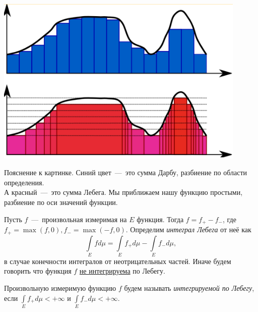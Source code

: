 \begin{minipage}{0.5\textwidth}%
    \includegraphics[width=0.9\textwidth]{images/Screenshot_7.png} 
\end{minipage}%
 \hfill%
 \begin{minipage}{0.5\textwidth}\raggedright
Пояснение к картинке. Синий цвет~---~это сумма Дарбу, разбиение по области определения.\\ А красный~---~это сумма Лебега. Мы приближаем нашу функцию простыми, разбиение по оси значений функции.
 \end{minipage}


\begin{definition}
    Пусть $f$~---~произвольная измеримая на $E$ функция. Тогда $f = f_+ - f_-$, где $f_+ = \max(f, 0), f_- = \max(-f, 0)$. Определим \textit{интеграл Лебега} от неё как \[\int\limits_E fd\mu = \int\limits_E f_+d\mu - \int\limits_E f_-d\mu,\] в случае конечности интегралов от неотрицательных частей. Иначе будем говорить что функция $f$ \underline{не интегрируема} по Лебегу.
\end{definition}
\begin{definition}
    Произвольную измеримую функцию $f$ будем называть \textit{интегрируемой по Лебегу}, если $\int\limits_E f_+d\mu < +\infty$ и $\int\limits_E f_-d\mu < +\infty$.
\end{definition}

